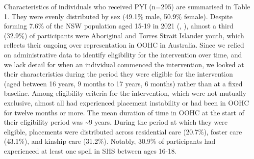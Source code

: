 \documentclass[
  jou,
  floatsintext,
  longtable,
  nolmodern,
  notxfonts,
  notimes,
  colorlinks=true,linkcolor=blue,citecolor=blue,urlcolor=blue]{apa7}
\begin{document}
Characteristics of individuals who received PYI (n=295) are summarised
in Table 1. They were evenly distributed by sex (49.1\% male, 50.9\%
female). Despite forming 7.6\% of the NSW population aged 15-19 in 2021
(,
), almost a third
(32.9\%) of participants were Aboriginal and Torres Strait Islander
youth, which reflects their ongoing over representation in OOHC in
Australia. Since we relied on administrative data to identify
eligibility for the intervention over time, and we lack detail for when
an individual commenced the intervention, we looked at their
characteristics during the period they were eligible for the
intervention (aged between 16 years, 9 months to 17 years, 6 months)
rather than at a fixed baseline. Among eligibility criteria for the
intervention, which were not mutually exclusive, almost all had
experienced placement instability or had been in OOHC for twelve months
or more. The mean duration of time in OOHC at the start of their
eligibility period was \textasciitilde9 years. During the period at
which they were eligible, placements were distributed across residential
care (20.7\%), foster care (43.1\%), and kinship care (31.2\%). Notably,
30.9\% of participants had experienced at least one spell in SHS between
ages 16-18.
\end{document}
